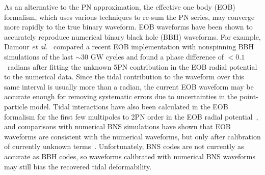 \documentclass[twocolumn,prd,amssymb,aps,nofootinbib,showpacs,epsf]{revtex4}
\newcommand\les[2]{\textcolor{blue}{{#1}\sout{#2}}}
\begin{document}

As an alternative to the PN approximation, the effective one body (EOB) formalism, which uses various techniques to re-sum the PN series, may converge more rapidly to the true binary waveform. EOB waveforms have been shown to accurately reproduce numerical binary black hole (BBH) waveforms. For example, Damour {\it et al.}~\cite{DamourNagarBernuzzi2013} compared a recent EOB implementation with nonspinning BBH simulations of the last $\sim 30$ GW cycles and found a phase difference of $<0.1$~radians after fitting the unknown 5PN contribution in the EOB radial potential to the numerical data. Since the tidal contribution to the waveform over this same interval is usually more than a radian, the current EOB waveform may be accurate enough for removing systematic errors due to uncertainties in the point-particle model. Tidal interactions have also been calculated in the EOB formalism for the first few multipoles to 2PN order in the EOB radial potential~\cite{BiniDamourFaye2012}, and comparisons with numerical BNS simulations have shown that EOB waveforms are consistent with the numerical waveforms, but only after calibration of currently unknown terms~\cite{BernuzziNagarThierfelder2012, HotokazakaKyutokuShibata2013}. Unfortunately, BNS codes are not currently as accurate as BBH codes, so waveforms calibrated with numerical BNS waveforms may still bias the recovered tidal deformability.
\end{document}
